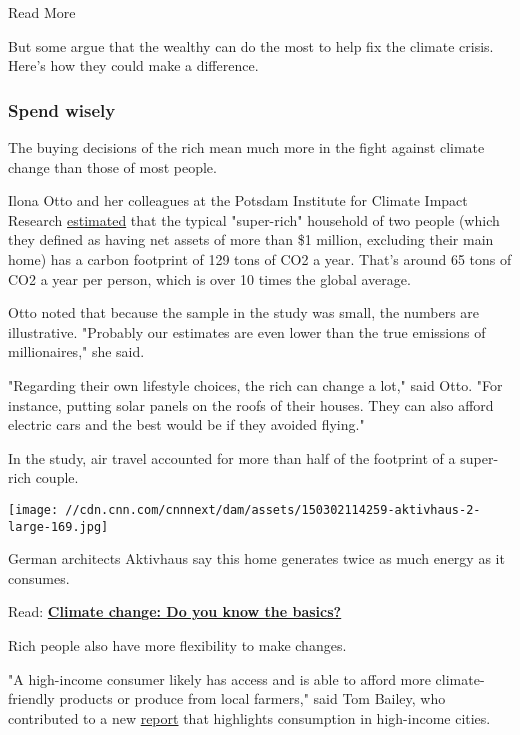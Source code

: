 Read More

But some argue that the wealthy can do the most to help fix the climate
crisis. Here's how they could make a difference.

\hypertarget{spend-wisely}{%
\subsubsection{Spend wisely}\label{spend-wisely}}

The buying decisions of the rich mean much more in the fight against
climate change than those of most people.

Ilona Otto and her colleagues at the Potsdam Institute for Climate
Impact Research
\href{https://www.nature.com/articles/s41558-019-0402-3}{estimated} that
the typical "super-rich" household of two people (which they defined as
having net assets of more than \$1 million, excluding their main home)
has a carbon footprint of 129 tons of CO2 a year. That's around 65 tons
of CO2 a year per person, which is over 10 times the global average.

Otto noted that because the sample in the study was small, the numbers
are illustrative. "Probably our estimates are even lower than the true
emissions of millionaires," she said.

"Regarding their own lifestyle choices, the rich can change a lot," said
Otto. "For instance, putting solar panels on the roofs of their houses.
They can also afford electric cars and the best would be if they avoided
flying."

In the study, air travel accounted for more than half of the footprint
of a super-rich couple.

\texttt{[image: //cdn.cnn.com/cnnnext/dam/assets/150302114259-aktivhaus-2-large-169.jpg]}

German architects Aktivhaus say this home generates twice as much energy
as it consumes.

Read:
\href{https://edition.cnn.com/2019/01/18/health/climate-change-google-questions-answered/index.html}{\textbf{Climate
change: Do you know the basics?}}

Rich people also have more flexibility to make changes.

"A high-income consumer likely has access and is able to afford more
climate-friendly products or produce from local farmers," said Tom
Bailey, who contributed to a new
\href{http://c40-production-images.s3.amazonaws.com/other_uploads/images/2233_WITH_FOREWORDS_-_Main_report__20190611_\%281\%29.original.pdf?1560286287}{report}
that highlights consumption in high-income cities.

